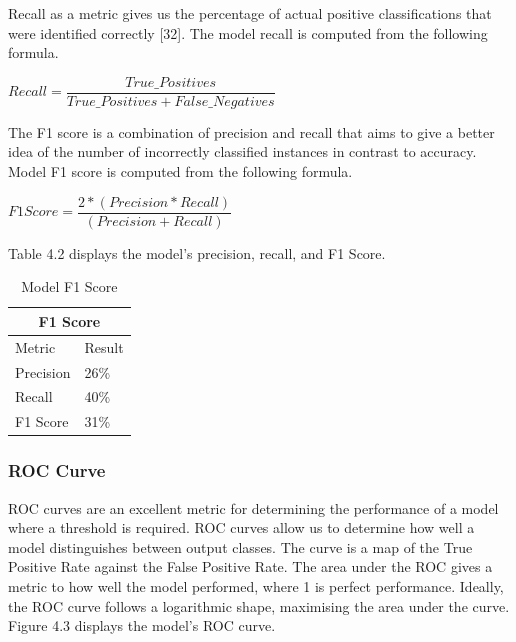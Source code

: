 Recall as a metric gives us the percentage of actual positive classifications that were identified correctly [32]. The model recall is computed from the following formula.

\begin{center}
$ Recall = \dfrac{True\_Positives}{True\_Positives + False\_Negatives}$
\end{center}

The F1 score is a combination of precision and recall that aims to give a better idea of the number of incorrectly classified instances in contrast to accuracy. Model F1 score is computed from the following formula. 
\begin{center}
$ F1  Score = \dfrac{2*(Precision * Recall)}{(Precision + Recall)}$
\end{center}

Table 4.2 displays the model's precision, recall, and F1 Score.

\begin{table}[htp]
    \centering
    \begin{tabular}{ |p{3.5cm}|p{3.0cm}|}
     \hline
     \multicolumn{2}{|c|}{F1 Score} \\
     \hline
     Metric& Result\\
     \hline
     \hline
     Precision&26\%\\
     \hline
     Recall&40\%\\
     \hline
     F1 Score&31\%\\
     \hline
    \end{tabular}
    \caption{Model F1 Score}
\end{table}

\subsubsection{ROC Curve}
ROC curves are an excellent metric for determining the performance of a model where a threshold is required. ROC curves allow us to determine how well a model distinguishes between output classes. The curve is a map of the True Positive Rate against the False Positive Rate. The area under the ROC gives a metric to how well the model performed, where 1 is perfect performance. Ideally, the ROC curve follows a logarithmic shape, maximising the area under the curve. Figure 4.3 displays the model's ROC curve.

